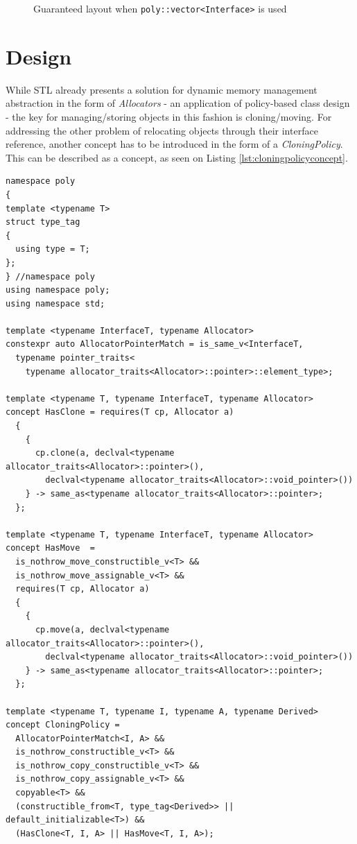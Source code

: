 \documentclass[a4paper,12pt]{article}
\begin{document}
\begin{figure}
\begin{minipage}{.5\textwidth}
    \caption{Guaranteed layout when \lstinline{poly::vector<Interface>} is used}
    \label{fig:polyvecbased}
\end{minipage}
\end{figure}

\newpage

\section{Design}

While STL already presents a solution for dynamic memory management abstraction in the form of \emph{Allocators} - an application of policy-based class design \cite{alexandrescu_2011_policybasedclassdesign} - the key for managing/storing objects in this fashion is cloning/moving. For addressing the other problem of relocating objects through their interface reference, another concept has to be introduced in the form of a \emph{CloningPolicy}. This can be described as a concept, as seen on Listing \ref{lst:cloningpolicyconcept}. 


\begin{lstlisting}[label={lst:cloningpolicyconcept},caption={CloningPolicy concept definition},captionpos=b]
namespace poly 
{
template <typename T> 
struct type_tag 
{
  using type = T;
};
} //namespace poly 
using namespace poly;
using namespace std;

template <typename InterfaceT, typename Allocator>
constexpr auto AllocatorPointerMatch = is_same_v<InterfaceT,
  typename pointer_traits<
    typename allocator_traits<Allocator>::pointer>::element_type>;

template <typename T, typename InterfaceT, typename Allocator>
concept HasClone = requires(T cp, Allocator a)
  {
    {
      cp.clone(a, declval<typename allocator_traits<Allocator>::pointer>(),
        declval<typename allocator_traits<Allocator>::void_pointer>())
    } -> same_as<typename allocator_traits<Allocator>::pointer>;
  };

template <typename T, typename InterfaceT, typename Allocator>
concept HasMove  = 
  is_nothrow_move_constructible_v<T> && 
  is_nothrow_move_assignable_v<T> && 
  requires(T cp, Allocator a)
  {
    {
      cp.move(a, declval<typename allocator_traits<Allocator>::pointer>(),
        declval<typename allocator_traits<Allocator>::void_pointer>())
    } -> same_as<typename allocator_traits<Allocator>::pointer>;
  };

template <typename T, typename I, typename A, typename Derived>
concept CloningPolicy = 
  AllocatorPointerMatch<I, A> &&
  is_nothrow_constructible_v<T> &&
  is_nothrow_copy_constructible_v<T> &&
  is_nothrow_copy_assignable_v<T> &&
  copyable<T> && 
  (constructible_from<T, type_tag<Derived>> || default_initializable<T>) &&
  (HasClone<T, I, A> || HasMove<T, I, A>);

\end{lstlisting}
\end{document}
